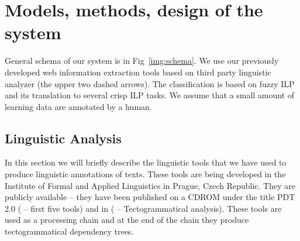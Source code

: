 \documentclass[authoryear,12pt]{elsarticle}
\begin{document}
%




\section{Models, methods, design of the system}


General schema of our system is in Fig~\ref{img:schema}. We use our previously developed web information extraction tools based on third party linguistic analyzer (the upper two dashed arrows). The classification is based on fuzzy ILP and its translation to several crisp ILP tasks. We assume that a small amount of learning data are annotated by a human.





\subsection{Linguistic Analysis}
In this section we will briefly describe the linguistic tools that
we have used to produce linguistic annotations of texts. 
These tools are being developed in the Institute of Formal
and Applied Linguistics in Prague, Czech Republic. They
are publicly available -- they have been published on a CDROM
under the title PDT 2.0 (\cite{dedek:PDT20_CD} -- first five tools) and in
(\cite{dedek:KlTransformationBasedTectogrammatical2006} -- Tectogrammatical analysis). These tools are used as a
processing chain and at the end of the chain they produce
tectogrammatical \citep{dedek:MiBeAnnotationtectogrammatical2006} dependency trees. 
\end{document}
